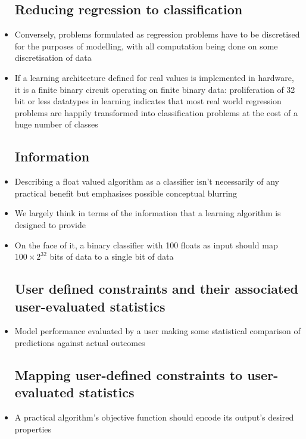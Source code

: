 \documentclass{article}
\begin{document}
\begin{itemize}
    \subsection{Reducing regression to classification}
    \item 
        Conversely, problems formulated as regression problems have to be discretised for the purposes of modelling, with all computation being done on some discretisation of data
      \item
        If a learning architecture defined for real values is implemented in hardware, it is a finite binary circuit operating on finite binary data: proliferation of 32 bit or less datatypes in learning indicates that most real world regression problems are happily transformed into classification problems at the cost of a huge number of classes
        \subsection{Information}
      \item
        Describing a float valued algorithm as a classifier isn't necessarily of any practical benefit but emphasises possible conceptual blurring
      \item
        We largely think in terms of the information that a learning algorithm is designed to provide
      \item
        On the face of it, a binary classifier with 100 floats as input should map $100\times2^{32}$ bits of data to a single bit of data

        \subsection{User defined constraints and their associated user-evaluated statistics}
    \item
      Model performance evaluated by a user making some statistical comparison of predictions against actual outcomes
      \subsection{Mapping user-defined constraints to user-evaluated statistics}
    \item
      A practical algorithm's objective function should encode its output's desired properties

\end{itemize}
\end{document}
